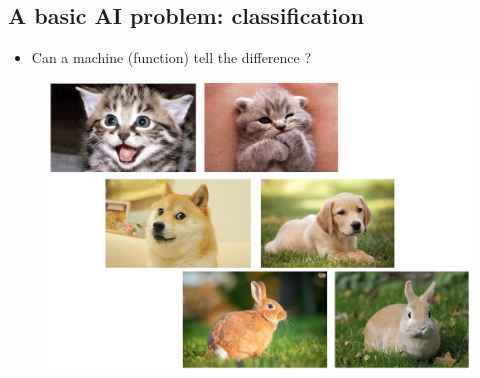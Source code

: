 \subsection{A basic AI problem: classification}
\begin{itemize}
	\item Can a machine (function) tell the difference ?
\end{itemize}
\begin{figure}
\centering
\includegraphics[width=.7\textwidth]{figures/cat-dog-1.png}
\end{figure}





